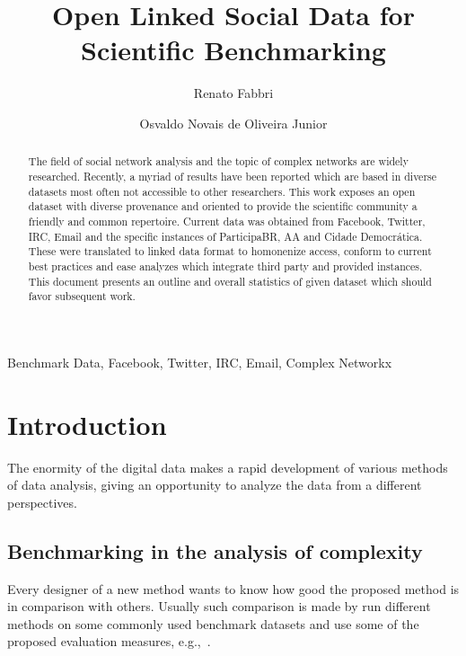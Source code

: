 \documentclass[review]{elsarticle}
\begin{document}
%
\begin{frontmatter}
%
\title{Open Linked Social Data for Scientific Benchmarking}
%
\author[pwr]{Renato Fabbri}
%
\author[pwr]{Osvaldo Novais de Oliveira Junior}
%
\address[pwr]{S\~ao Carlos Institute of Physics, S\~ao Paulo
University, Brazil}
%
%
\begin{abstract}
The field of social network analysis and the topic of complex networks
are widely researched.
Recently, a myriad of results have been reported which are based in
diverse datasets most often not accessible to other researchers.
This work exposes an open dataset with diverse provenance and oriented
to provide the scientific community a friendly and common repertoire.
Current data was obtained from Facebook, Twitter, IRC, Email and the specific
instances of ParticipaBR, AA and Cidade Democr\'atica.
These were translated to linked data format to homonenize access,
conform to current best practices and ease analyzes which integrate third
party and provided instances.
This document presents an outline and overall statistics of given
dataset which should favor subsequent work.
\end{abstract}
%
\begin{keyword}
Benchmark Data, Facebook, Twitter, IRC, Email, Complex Networkx
\end{keyword}

\end{frontmatter}

\section{Introduction}
The enormity of the digital data makes a rapid development of various methods of data analysis,
giving an opportunity to analyze the data from a different perspectives.

\subsection{Benchmarking in the analysis of complexity}
%
Every designer of a new method wants to know how good the proposed method is in comparison with others.
Usually such comparison is made by run different methods on some commonly used benchmark datasets and use some of the proposed evaluation measures, e.g.,~\cite{Dreiseitl200128,Cooper1997107,Douglas2011544,Kampichler2010441,DBLP:journals/corr/abs-1301-7401,steinbach00comparison,Kakkar2014}.
%
\end{document}
